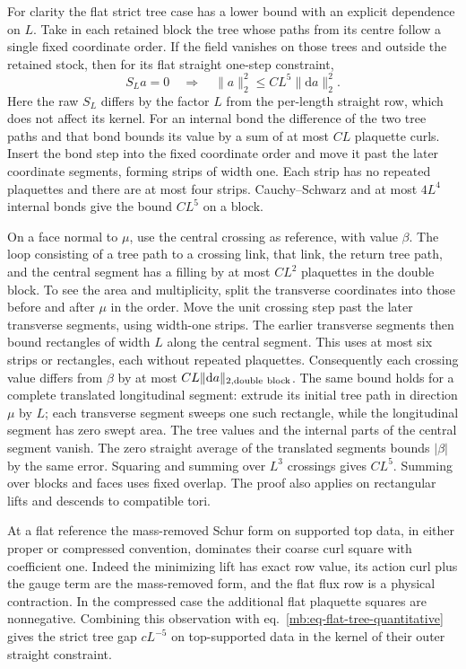 \documentclass[11pt,letterpaper,reqno]{amsart}
\numberwithin{equation}{section}
\renewcommand{\eqref}[1]{\textup{eq.~\ref{#1}}}
\theoremstyle{definition}
\theoremstyle{remark}
\begin{document}
For clarity the flat strict tree case has a lower bound
with an explicit dependence on \(L\). Take in each
retained block the tree whose paths from its centre
follow a single fixed coordinate order. If the field
vanishes on those trees and outside the retained stock,
then for its flat straight one-step constraint,
\begin{equation}\label{mb:eq-flat-tree-quantitative}
       S_La=0\quad\Longrightarrow\quad
                   \|a\|_2^2\le C L^5\|\mathrm da\|_2^2 .
\end{equation}
Here the raw \(S_L\) differs by the factor \(L\) from the
per-length straight row, which does not affect its kernel.
For an internal bond the difference of the two tree
paths and that bond bounds its value by a sum of at most
\(C L\) plaquette curls. Insert the bond step into the
fixed coordinate order and move it past the later
coordinate segments, forming strips of width one.
Each strip has no repeated plaquettes and there are at
most four strips. Cauchy--Schwarz and at most \(4L^4\)
internal bonds give the bound \(CL^5\) on a block.

On a face normal to \(\mu\), use the central crossing
as reference, with value \(\beta\). The loop consisting
of a tree path to a crossing link, that link, the return
tree path, and the central segment has a filling by at
most \(C L^2\) plaquettes in the double block. To see the
area and multiplicity, split the transverse coordinates
into those before and after \(\mu\) in the order. Move
the unit crossing step past the later transverse
segments, using width-one strips. The earlier transverse
segments then bound rectangles of width \(L\) along
the central segment. This uses at most six strips or
rectangles, each without repeated plaquettes.
Consequently each crossing value differs from \(\beta\)
by at most \(CL\|\mathrm da\|_{2,\rm double\ block}\).
The same bound holds for a complete translated
longitudinal segment: extrude its initial tree path
in direction \(\mu\) by \(L\); each transverse segment
sweeps one such rectangle, while the longitudinal
segment has zero swept area. The tree values and the
internal parts of the central segment vanish. The
zero straight average of the translated segments
bounds \(|\beta|\) by the same error. Squaring and
summing over \(L^3\) crossings gives \(CL^5\).
Summing over blocks and faces uses fixed overlap.
The proof also applies on rectangular lifts and
descends to compatible tori.

At a flat reference the mass-removed Schur form on
supported top data, in either proper or compressed
convention, dominates their coarse curl square with
coefficient one. Indeed the minimizing lift has exact
row value, its action curl plus the gauge term are
the mass-removed form, and the flat flux row is a
physical contraction. In the compressed case the
additional flat plaquette squares are nonnegative.
Combining this observation with \eqref{mb:eq-flat-tree-quantitative}
gives the strict tree gap \(c L^{-5}\) on top-supported
data in the kernel of their outer straight constraint.
\end{document}
